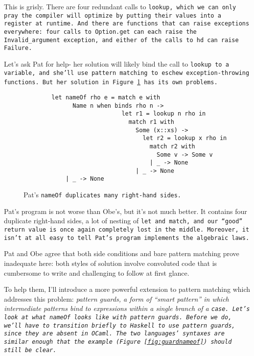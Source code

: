 \documentclass[manuscript,screen,review, 12pt]{acmart}
\begin{document}
    This is grisly. There are four redundant calls to \tt{lookup}, which we can
    only pray the compiler will optimize by putting their values into a register
    at runtime. And there are functions that can raise exceptions everywhere:
    four calls to \tt{Option.get} can each raise the \tt{Invalid\_argument}
    exception, and either of the calls to \tt{hd} can raise \tt{Failure}. 

    Let's ask Pat for help- her solution will likely bind the call to
    \tt{lookup} to a variable, and she'll use pattern matching to eschew
    exception-throwing functions. But her solution in Figure~\ref{fig:patnameof} has
    its own problems. 

    \begin{figure}[ht]
        \begin{verbatim}
        let nameOf rho e = match e with     
              Name n when binds rho n -> 
                            let r1 = lookup n rho in 
                              match r1 with 
                                Some (x::xs) -> 
                                  let r2 = lookup x rho in 
                                    match r2 with 
                                      Some v -> Some v   
                                    | _ -> None
                                | _ -> None
            | _ -> None 
            \end{verbatim}
        \caption{Pat's \tt{nameOf} duplicates many right-hand sides.}
        \label{fig:patnameof}
    \end{figure}

    Pat's program is not worse than Obe's, but it's not much better. It contains
    four duplicate right-hand sides, a lot of nesting of \tt{let} and
    \tt{match}, and our “good” return value is once again completely lost in the
    middle. Moreover, it isn't at all easy to tell Pat's program implements the
    algebraic laws.
    
    Pat and Obe agree that both side conditions and bare pattern matching prove
    inadequate here: both styles of solution involve convoluted code that is
    cumbersome to write and challenging to follow at first glance. 
    
    To help them, I'll introduce a more powerful extension to pattern matching
    which addresses this problem: \it{pattern guards}, a form of “smart pattern”
    in which intermediate patterns bind to expressions within a single branch of
    a \tt{case}. Let's look at what \tt{nameOf} looks like with pattern guards.
    Before we do, we'll have to transition briefly to Haskell to use pattern
    guards, since they are absent in OCaml. The two languages' syntaxes are
    similar enough that the example (Figure~\ref{fig:guardnameof}) should still
    be clear. 
\end{document}
